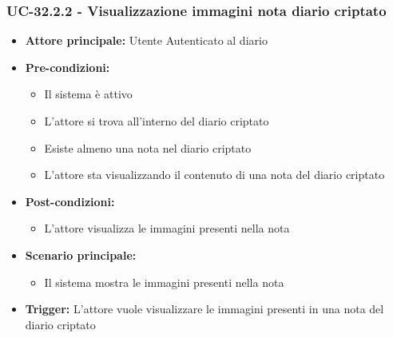 \documentclass[a4paper,12pt]{article}
\begin{document}
\subsubsection{UC-32.2.2 - Visualizzazione immagini nota diario criptato} \label{subsec:UC-32.2.2}
\begin{itemize}
    \item \textbf{Attore principale:} Utente Autenticato al diario
    \item \textbf{Pre-condizioni:}
    \begin{itemize}
        \item Il sistema è attivo
        \item L'attore si trova all'interno del diario criptato
        \item Esiste almeno una nota nel diario criptato
        \item L'attore sta visualizzando il contenuto di una nota del diario criptato
    \end{itemize}
    \item \textbf{Post-condizioni:}
    \begin{itemize}
        \item L'attore visualizza le immagini presenti nella nota
    \end{itemize}
    \item \textbf{Scenario principale:}
    \begin{itemize}
        \item Il sistema mostra le immagini presenti nella nota 
    \end{itemize}
    \item \textbf{Trigger:} L'attore vuole visualizzare le immagini presenti in una nota del diario criptato
\end{itemize}
\end{document}
